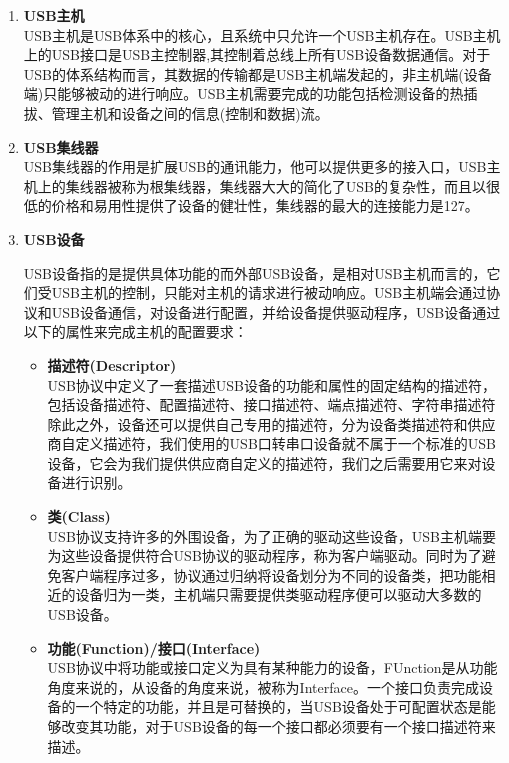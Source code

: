 \begin{enumerate}
\item \textbf{USB主机}\\
	USB主机是USB体系中的核心，且系统中只允许一个USB主机存在。USB主机上的USB接口是USB主控制器,其控制着总线上所有USB设备数据通信。对于USB的体系结构而言，其数据的传输都是USB主机端发起的，非主机端(设备端)只能够被动的进行响应。USB主机需要完成的功能包括检测设备的热插拔、管理主机和设备之间的信息(控制和数据)流\cite{李雪红2004USB}\cite{莫宏伟2001USB}。

\item \textbf{USB集线器}\\	
	USB集线器的作用是扩展USB的通讯能力，他可以提供更多的接入口，USB主机上的集线器被称为根集线器，集线器大大的简化了USB的复杂性，而且以很低的价格和易用性提供了设备的健壮性\cite{李雪红2004USB}，集线器的最大的连接能力是127。


\item \textbf{USB设备}

	USB设备指的是提供具体功能的而外部USB设备，是相对USB主机而言的，它们受USB主机的控制，只能对主机的请求进行被动响应。USB主机端会通过协议和USB设备通信，对设备进行配置，并给设备提供驱动程序，USB设备通过以下的属性来完成主机的配置要求：
	\begin{itemize}
	\item \textbf{描述符(Descriptor)}\\
	USB协议中定义了一套描述USB设备的功能和属性的固定结构的描述符，包括设备描述符、配置描述符、接口描述符、端点描述符、字符串描述符\cite{张杰2008基于}\cite{边海龙2004USB}除此之外，设备还可以提供自己专用的描述符，分为设备类描述符和供应商自定义描述符，我们使用的USB口转串口设备就不属于一个标准的USB设备，它会为我们提供供应商自定义的描述符，我们之后需要用它来对设备进行识别。
	
	\item \textbf{类(Class)}\\
	USB协议支持许多的外围设备，为了正确的驱动这些设备，USB主机端要为这些设备提供符合USB协议的驱动程序，称为客户端驱动。同时为了避免客户端程序过多，协议通过归纳将设备划分为不同的设备类，把功能相近的设备归为一类，主机端只需要提供类驱动程序便可以驱动大多数的USB设备\cite{李雪红2004USB}。	
	
	\item \textbf{功能(Function)/接口(Interface)}\\
	USB协议中将功能或接口定义为具有某种能力的设备，FUnction是从功能角度来说的，从设备的角度来说，被称为Interface。一个接口负责完成设备的一个特定的功能，并且是可替换的，当USB设备处于可配置状态是能够改变其功能，对于USB设备的每一个接口都必须要有一个接口描述符来描述。
	

\end{itemize}
\end{enumerate}
